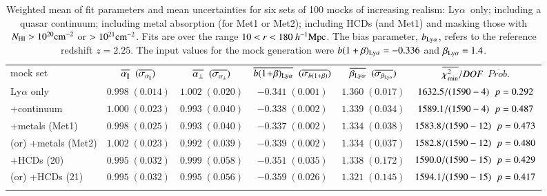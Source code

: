 \documentclass{aa}
\newcommand{\apar}{\alpha_\parallel}
\newcommand{\aperp}{\alpha_\perp}
\newcommand{\hMpc}{h^{-1}{\rm Mpc}}
\newcommand{\Lya}{Ly$\alpha$~}
\newcommand{\betalya}{\beta_{\rm Ly\alpha}}
\newcommand{\blya}{b_{\rm Ly\alpha}}
\newcommand{\NHI}{N_{\rm HI}}
\begin{document}
\begin{table*}[ht]
\begin{center}
\caption{
  Weighted mean of fit parameters and
  mean uncertainties for six sets of 100 mocks
  of increasing realism: \Lya only; including a quasar continuum; 
  including metal absorption (for Met1 or Met2); including 
  HCDs (and Met1) and masking
  those with $\NHI>10^{20}{\rm cm^{-2}}$ or $>10^{21}{\rm cm^{-2}}$.
  Fits are over the range $10<r<180~\hMpc$.
  The bias parameter, $\blya$, refers to  the reference redshift $z=2.25$.
  The input values for the mock generation were $b(1+\beta)_{\rm Ly\alpha}=-0.336$
  and $\betalya=1.4$.
  }
\begin{tabular}{l c c c c c}
mock set  
    & $\overline{\apar}\hspace*{2mm}(\overline{\sigma_{\apar}})$ 
    & $\overline{\aperp}\hspace*{2mm}(\overline{\sigma_{\aperp}})$  
    & $\overline{b(1 \! + \! \beta)_{\rm Ly\alpha}}\hspace*{2mm}(\overline{\sigma_{b(1+\beta)}})$
    & $\overline{\betalya}\hspace*{2mm}(\overline{\sigma_{\betalya}})$
    & $\overline{\chi^2_{\rm min}}/DOF$\hspace*{3mm} $\overline{Prob.}$  \\
\noalign{\smallskip} 
\hline
\noalign{\smallskip}
Ly$\alpha$ only & $ 0.998 \; ( 0.014 ) $ & $ 1.002 \; ( 0.020 ) $ & $ -0.341 \; ( 0.001 ) $ & $ 1.360 \; ( 0.017 ) $ & $ 1632.5 /( 1590 - 4 ) \hspace*{2mm}p= 0.292 $ \\ %
+continuum & $ 1.000 \; ( 0.023 ) $ & $ 0.993 \; ( 0.040 ) $ & $ -0.338 \; ( 0.002 ) $ & $ 1.339 \; ( 0.034 ) $ & $ 1589.1 /( 1590 - 4 ) \hspace*{2mm}p= 0.487 $ \\ %
+metals (Met1) & $ 0.998 \; ( 0.025 ) $ & $ 0.993 \; ( 0.040 ) $ & $ -0.337 \; ( 0.002 ) $ & $ 1.334 \; ( 0.038 ) $ & $ 1583.8 /( 1590 - 12 ) \hspace*{2mm}p= 0.473 $ \\ %
(or) +metals (Met2) & $ 1.002 \; ( 0.023 ) $ & $ 0.992 \; ( 0.039 ) $ & $ -0.339 \; ( 0.002 ) $ & $ 1.334 \; ( 0.037 ) $ & $ 1582.8 /( 1590 - 12 ) \hspace*{2mm}p= 0.480 $ \\ %
+HCDs (20) & $ 0.995 \; ( 0.032 ) $ & $ 0.999 \; ( 0.058 ) $ & $ -0.351 \; ( 0.035 ) $ & $ 1.338 \; ( 0.172 ) $ & $ 1590.0 /( 1590 - 15 ) \hspace*{2mm}p= 0.429 $ \\ %
(or) +HCDs (21) & $ 0.995 \; ( 0.032 ) $ & $ 0.995 \; ( 0.056 ) $ & $ -0.359 \; ( 0.026 ) $ & $ 1.321 \; ( 0.145 ) $ & $ 1594.1 /( 1590 - 15 ) \hspace*{2mm}p= 0.417 $ \\ %
\label{fitmocktable}
\end{tabular}
\end{center}
\end{table*}
\end{document}
